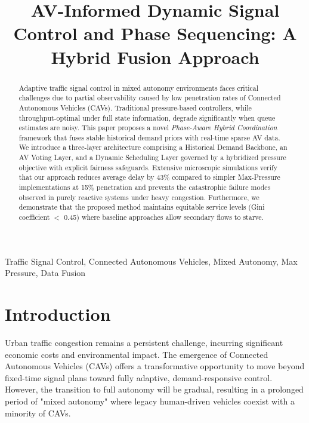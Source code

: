 \documentclass[conference]{IEEEtran}
\begin{document}
\title{AV-Informed Dynamic Signal Control and Phase Sequencing: A Hybrid Fusion Approach}

\author{
}

\maketitle

\begin{abstract}
Adaptive traffic signal control in mixed autonomy environments faces critical challenges due to partial observability caused by low penetration rates of Connected Autonomous Vehicles (CAVs). Traditional pressure-based controllers, while throughput-optimal under full state information, degrade significantly when queue estimates are noisy. This paper proposes a novel \textit{Phase-Aware Hybrid Coordination} framework that fuses stable historical demand priors with real-time sparse AV data. We introduce a three-layer architecture comprising a Historical Demand Backbone, an AV Voting Layer, and a Dynamic Scheduling Layer governed by a hybridized pressure objective with explicit fairness safeguards. Extensive microscopic simulations verify that our approach reduces average delay by 43\% compared to simpler Max-Pressure implementations at 15\% penetration and prevents the catastrophic failure modes observed in purely reactive systems under heavy congestion. Furthermore, we demonstrate that the proposed method maintains equitable service levels (Gini coefficient $<$ 0.45) where baseline approaches allow secondary flows to starve.
\end{abstract}

\begin{IEEEkeywords}
Traffic Signal Control, Connected Autonomous Vehicles, Mixed Autonomy, Max Pressure, Data Fusion
\end{IEEEkeywords}

\section{Introduction}
\label{sec:introduction}
Urban traffic congestion remains a persistent challenge, incurring significant economic costs and environmental impact. The emergence of Connected Autonomous Vehicles (CAVs) offers a transformative opportunity to move beyond fixed-time signal plans toward fully adaptive, demand-responsive control. However, the transition to full autonomy will be gradual, resulting in a prolonged period of "mixed autonomy" where legacy human-driven vehicles coexist with a minority of CAVs.
\end{document}

